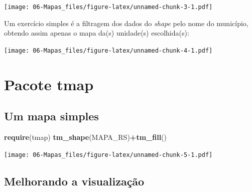 \documentclass[12pt,brazil,]{book}
\newenvironment{Shaded}{\begin{snugshade}}{\end{snugshade}}
\newcommand{\DataTypeTok}[1]{\textcolor[rgb]{0.13,0.29,0.53}{#1}}
\newcommand{\DecValTok}[1]{\textcolor[rgb]{0.00,0.00,0.81}{#1}}
\newcommand{\FloatTok}[1]{\textcolor[rgb]{0.00,0.00,0.81}{#1}}
\newcommand{\KeywordTok}[1]{\textcolor[rgb]{0.13,0.29,0.53}{\textbf{#1}}}
\newcommand{\NormalTok}[1]{#1}
\newcommand{\OperatorTok}[1]{\textcolor[rgb]{0.81,0.36,0.00}{\textbf{#1}}}
\newcommand{\StringTok}[1]{\textcolor[rgb]{0.31,0.60,0.02}{#1}}
\begin{document}
\texttt{[image: 06-Mapas\_files/figure-latex/unnamed-chunk-3-1.pdf]}

Um exercício simples é a filtragem dos dados do \emph{shape} pelo nome
do município, obtendo assim apenas o mapa da(s) unidade(s) escolhida(s):

\begin{Shaded}
\end{Shaded}

\texttt{[image: 06-Mapas\_files/figure-latex/unnamed-chunk-4-1.pdf]}

\hypertarget{pacote-tmap}{%
\section{Pacote tmap}\label{pacote-tmap}}

\hypertarget{um-mapa-simples}{%
\subsection{Um mapa simples}\label{um-mapa-simples}}

\begin{Shaded}
\begin{Highlighting}[]
\KeywordTok{require}\NormalTok{(tmap)}
\KeywordTok{tm_shape}\NormalTok{(MAPA_RS)}\OperatorTok{+}\KeywordTok{tm_fill}\NormalTok{()}
\end{Highlighting}
\end{Shaded}

\texttt{[image: 06-Mapas\_files/figure-latex/unnamed-chunk-5-1.pdf]}

\hypertarget{melhorando-a-visualizacao}{%
\subsection{Melhorando a visualização}\label{melhorando-a-visualizacao}}
\end{document}
